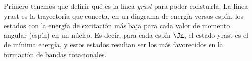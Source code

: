    Primero tenemos que definir qué es la línea \textit{yrast} para poder constuirla. La línea yrast es la trayectoria que conecta, en un diagrama de energía versus espín, los estados con la energía de excitación más baja para cada valor de momento angular (espín) en un núcleo. Es decir, para cada espín $\Jn$, el estado yrast es el de mínima energía, y estos estados resultan ser los más favorecidos en la formación de bandas rotacionales.
